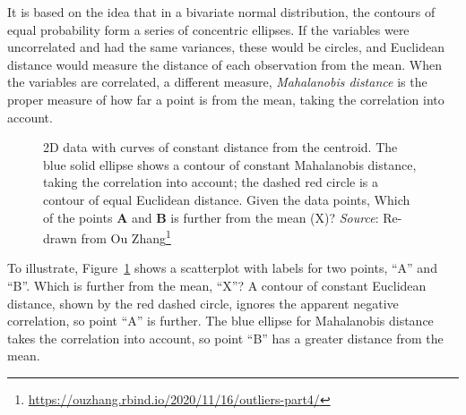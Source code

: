 \documentclass[
  letterpaper,
  10pt,
  krantz2]{krantz}
\providecommand{\href}[2]{#2\footnote{\url{#1}}}
\begin{document}
It is based on the idea that in a bivariate normal distribution, the
contours of equal probability form a series of concentric ellipses. If
the variables were uncorrelated and had the same variances, these would
be circles, and Euclidean distance would measure the distance of each
observation from the mean. When the variables are correlated, a
different measure, \emph{Mahalanobis distance} is the proper measure of
how far a point is from the mean, taking the correlation into account.

\begin{figure}


\caption{\label{fig-mahalanobis}2D data with curves of constant distance
from the centroid. The blue solid ellipse shows a contour of constant
Mahalanobis distance, taking the correlation into account; the dashed
red circle is a contour of equal Euclidean distance. Given the data
points, Which of the points \textbf{A} and \textbf{B} is further from
the mean (X)? \emph{Source}: Re-drawn from
\href{https://ouzhang.rbind.io/2020/11/16/outliers-part4/}{Ou Zhang}}

\end{figure}%

To illustrate, Figure~\ref{fig-mahalanobis} shows a scatterplot with
labels for two points, ``A'' and ``B''. Which is further from the mean,
``X''? A contour of constant Euclidean distance, shown by the red dashed
circle, ignores the apparent negative correlation, so point ``A'' is
further. The blue ellipse for Mahalanobis distance takes the correlation
into account, so point ``B'' has a greater distance from the mean.
\end{document}
